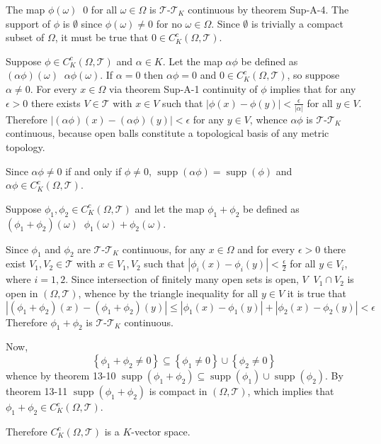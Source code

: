 \documentclass[a4paper]{article}
\newcommand{\obj}[1]{\left\{ #1 \right \}}
\newcommand{\brac}[1]{\left ( #1 \right )}
\newcommand{\abs}[1]{\left | #1 \right |}
\newcommand{\Tcal}{\mathcal{T}}
\newcommand{\Supp}[1]{\operatorname{supp}\nolimits\brac{#1}}
\newcommand{\defn}{\mathop{\overset{\Delta}{=}}\nolimits}
\begin{document}
The map $\phi\brac{\omega}\defn 0$ for all $\omega\in \Omega$ is $\Tcal$-$\Tcal_K$ continuous by theorem Sup-A-4. The support of $\phi$ is $\emptyset$ since $\phi\brac{\omega}\neq 0$ for no $\omega\in\Omega$. Since $\emptyset$ is trivially a compact subset of $\Omega$, it must be true that $0\in C^c_K\brac{\Omega,\Tcal}$.

Suppose $\phi\in C^c_K\brac{\Omega,\Tcal}$ and $\alpha\in K$. Let the map $\alpha \phi$ be defined as $\brac{\alpha \phi}\brac{\omega}\defn \alpha \phi\brac{\omega}$. If $\alpha=0$ then $\alpha \phi = 0$ and $0\in C^c_K\brac{\Omega,\Tcal}$, so suppose $\alpha\neq 0$. For every $x\in \Omega$ via theorem Sup-A-1 continuity of $\phi$ implies that for any $\epsilon>0$ there exists $V\in \Tcal$ with $x\in V$ such that $\abs{\phi\brac{x}-\phi\brac{y}}<\frac{\epsilon}{\abs{\alpha}}$ for all $y\in V$. Therefore $\abs{\brac{\alpha\phi}\brac{x}-\brac{\alpha\phi}\brac{y}}<\epsilon$ for any $y\in V$, whence $\alpha\phi$ is $\Tcal$-$\Tcal_K$ continuous, because open balls constitute a topological basis of any metric topology.

Since $\alpha\phi\neq 0$ if and only if $\phi\neq 0$, $\Supp{\alpha\phi} = \Supp{\phi}$ and $\alpha\phi\in C^c_K\brac{\Omega,\Tcal}$.

Suppose $\phi_1,\phi_2\in C^c_K\brac{\Omega,\Tcal}$ and let the map $\phi_1+\phi_2$ be defined as $\brac{\phi_1+\phi_2}\brac{\omega}\defn \phi_1\brac{\omega}+\phi_2\brac{\omega}$.

Since $\phi_1$ and $\phi_2$ are $\Tcal$-$\Tcal_K$ continuous, for any $x\in \Omega$ and for every $\epsilon>0$ there exist $V_1,V_2\in \Tcal$ with $x\in V_1,V_2$ such that $\abs{\phi_i\brac{x}-\phi_i\brac{y}}<\frac{\epsilon}{2}$ for all $y\in V_i$, where $i=1,2$. Since intersection of finitely many open sets is open, $V\defn V_1\cap V_2$ is open in $\brac{\Omega, \Tcal}$, whence by the triangle inequality for all $y\in V$ it is true that \[\abs{\brac{\phi_1+\phi_2}\brac{x}-\brac{\phi_1+\phi_2}\brac{y}}\leq \abs{\phi_1\brac{x}-\phi_1\brac{y}} + \abs{\phi_2\brac{x}-\phi_2\brac{y}} < \epsilon\] Therefore $\phi_1+\phi_2$ is $\Tcal$-$\Tcal_K$ continuous.

Now, \[\obj{\phi_1+\phi_2\neq 0}\subseteq \obj{\phi_1\neq 0}\cup \obj{\phi_2\neq 0}\] whence by theorem 13-10 $\Supp{\phi_1+\phi_2}\subseteq \Supp{\phi_1}\cup\Supp{\phi_2}$. By theorem 13-11 $\Supp{\phi_1+\phi_2}$ is compact in $\brac{\Omega,\Tcal}$, which implies that $\phi_1+\phi_2\in C^c_K\brac{\Omega,\Tcal}$.

Therefore $C^c_K\brac{\Omega,\Tcal}$ is a $K$-vector space.
\end{document}
